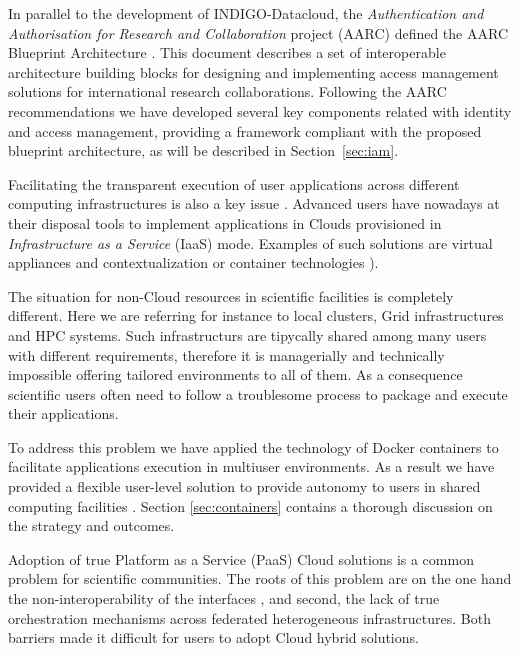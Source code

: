 \documentclass{article}
\begin{document}
In parallel to the development of INDIGO-Datacloud, the
{\sl Authentication and Authorisation for Research and Collaboration} project (AARC)
defined the AARC Blueprint Architecture \cite{aarc}. This document describes a 
set of interoperable architecture building blocks for designing and implementing access management
solutions for international research collaborations. Following the AARC recommendations we have
developed several key components related with identity and access management,
providing a framework compliant with the proposed blueprint architecture, as
will be described in Section~\ref{sec:iam}.

Facilitating the transparent execution of user applications across different
computing infrastructures is also a key issue \cite{Oesterle2015}. 
Advanced users have nowadays at their disposal tools to implement 
applications in Clouds provisioned in {\sl Infrastructure as a Service} (IaaS) mode. 
Examples of such solutions are virtual appliances and contextualization \cite{Campos2013} or 
container technologies \cite{boettiger2015introduction}). 

The situation for non-Cloud resources in scientific facilities is completely different.
Here we are referring for instance to local clusters, Grid infrastructures and HPC systems. 
Such infrastructurs are tipycally shared among many users with different requirements, therefore 
it is managerially and technically impossible offering tailored environments to all of them.
As a consequence scientific users often need to follow a troublesome process to package and 
execute their applications. 

To address this problem we have applied the technology of Docker containers \cite{DOCKER} to facilitate applications execution in multiuser environments. As a result we have provided a flexible user-level solution to provide autonomy to users in shared computing facilities \cite{udocker-paper}. Section \ref{sec:containers} contains a thorough discussion on the strategy and outcomes.

Adoption of true Platform as a Service (PaaS) Cloud solutions is a common problem for
scientific communities. The roots of this problem are on the one hand the non-interoperability of the interfaces \cite{Zhang2013,Lorido-Botran2014}, and second, the lack of true orchestration
mechanisms across federated heterogeneous infrastructures. Both barriers made it difficult 
for users to adopt Cloud hybrid solutions.
\end{document}
